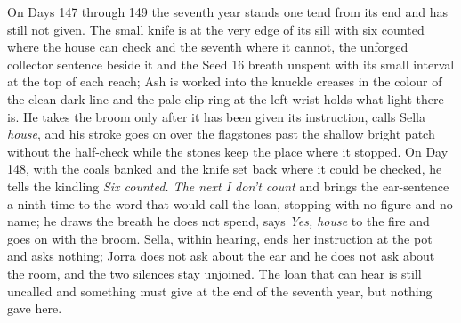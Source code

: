 \documentclass{design/chronicle}
\begin{document}
{On Days 147 through 149 the seventh year stands one tend from its end and has still not given. The small knife is at the very edge of its sill with six counted where the house can check and the seventh where it cannot, the unforged collector sentence beside it and the Seed 16 breath unspent with its small interval at the top of each reach; Ash is worked into the knuckle creases in the colour of the clean dark line and the pale clip-ring at the left wrist holds what light there is. He takes the broom only after it has been given its instruction, calls Sella \emph{house}, and his stroke goes on over the flagstones past the shallow bright patch without the half-check while the stones keep the place where it stopped. On Day 148, with the coals banked and the knife set back where it could be checked, he tells the kindling \emph{Six counted. The next I don’t count} and brings the ear-sentence a ninth time to the word that would call the loan, stopping with no figure and no name; he draws the breath he does not spend, says \emph{Yes, house} to the fire and goes on with the broom. Sella, within hearing, ends her instruction at the pot and asks nothing; Jorra does not ask about the ear and he does not ask about the room, and the two silences stay unjoined. The loan that can hear is still uncalled and something must give at the end of the seventh year, but nothing gave here.

}
\end{document}
